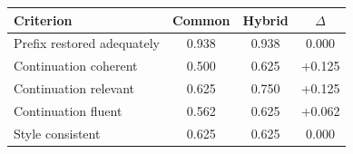 \begin{tabular}{l c c c}
\toprule
Criterion & Common & Hybrid & $\Delta$ \\
\midrule
Prefix restored adequately & 0.938 & 0.938 & 0.000 \\
Continuation coherent      & 0.500 & 0.625 & +0.125 \\
Continuation relevant      & 0.625 & 0.750 & +0.125 \\
Continuation fluent        & 0.562 & 0.625 & +0.062 \\
Style consistent           & 0.625 & 0.625 & 0.000 \\
\bottomrule
\end{tabular}
